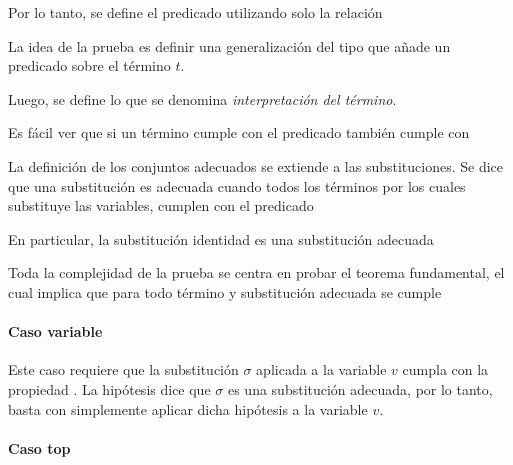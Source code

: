 Por lo tanto, se define el predicado  utilizando solo la relación \type{$\_\hookrightarrow\_$}


La idea de la prueba es definir una generalización del tipo  que añade un predicado sobre el término $t$.


Luego, se define lo que se denomina \textit{interpretación del término}.


Es fácil ver que si un término cumple con el predicado  también cumple con 


La definición de los conjuntos adecuados se extiende a las substituciones.
Se dice que una substitución es adecuada cuando todos los términos por los cuales substituye las variables, cumplen con el predicado \snstar


En particular, la substitución identidad  es una substitución adecuada


Toda la complejidad de la prueba se centra en probar el teorema fundamental, el cual implica que para todo término  y substitución adecuada  se cumple
\snstar{}


\paragraph{Caso variable}

Este caso requiere que la substitución $\sigma$ aplicada a la variable $v$ cumpla con la propiedad
\snstar.
La hipótesis dice que $\sigma$ es una substitución adecuada, por lo tanto, basta con simplemente aplicar dicha hipótesis a la variable $v$.


\paragraph{Caso top}

